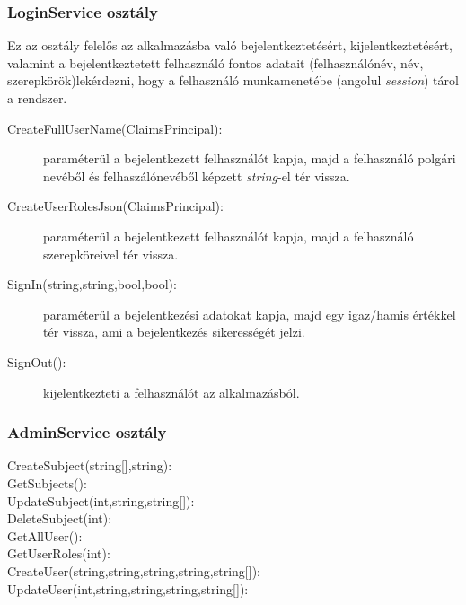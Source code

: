 \subsubsection{LoginService osztály}
Ez az osztály felelős az alkalmazásba való bejelentkeztetésért, kijelentkeztetésért, valamint a bejelentkeztetett felhasználó fontos adatait (felhasználónév, név, szerepkörök)lekérdezni, hogy a felhasználó munkamenetébe (angolul \emph{session}) tárol a rendszer.
\begin{description}
	\item[CreateFullUserName(ClaimsPrincipal):] paraméterül a bejelentkezett felhasználót kapja, majd a felhasználó polgári nevéből és felhaszálónevéből képzett \emph{string}-el tér vissza.
	\item[CreateUserRolesJson(ClaimsPrincipal):] paraméterül a bejelentkezett felhasználót kapja, majd a felhasználó szerepköreivel tér vissza.
	\item[SignIn(string,string,bool,bool):] paraméterül a bejelentkezési adatokat kapja, majd egy igaz/hamis értékkel tér vissza, ami a bejelentkezés sikerességét jelzi.
	\item[SignOut():] kijelentkezteti a felhasználót az alkalmazásból.
\end{description}
\subsubsection{AdminService osztály}
\begin{description}
	\item[CreateSubject(string{[]},string):] 
	\item[GetSubjects():] 
	\item[UpdateSubject(int,string,string{[]}):] 
	\item[DeleteSubject(int):] 
	\item[GetAllUser():] 
	\item[GetUserRoles(int):] 
	\item[CreateUser(string,string,string,string,string{[]}):] 
	\item[UpdateUser(int,string,string,string,string{[]}):] 
\end{description}
